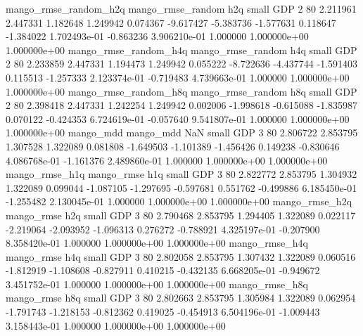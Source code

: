mango_rmse_random_h2q mango_rmse_random                  h2q      small      GDP                 2 80 2.211961       2.447331 1.182648       1.249942    0.074367     -9.617427     -5.383736    -1.577631       0.118647 -1.384022 1.702493e-01    -0.863236   3.906210e-01            1.000000    1.000000e+00        1.000000e+00
mango_rmse_random_h4q mango_rmse_random                  h4q      small      GDP                 2 80 2.233859       2.447331 1.194473       1.249942    0.055222     -8.722636     -4.437744    -1.591403       0.115513 -1.257333 2.123374e-01    -0.719483   4.739663e-01            1.000000    1.000000e+00        1.000000e+00
mango_rmse_random_h8q mango_rmse_random                  h8q      small      GDP                 2 80 2.398418       2.447331 1.242254       1.249942    0.002006     -1.998618     -0.615088    -1.835987       0.070122 -0.424353 6.724619e-01    -0.057640   9.541807e-01            1.000000    1.000000e+00        1.000000e+00
            mango_mdd         mango_mdd                  NaN      small      GDP                 3 80 2.806722       2.853795 1.307528       1.322089    0.081808     -1.649503     -1.101389    -1.456426       0.149238 -0.830646 4.086768e-01    -1.161376   2.489860e-01            1.000000    1.000000e+00        1.000000e+00
       mango_rmse_h1q        mango_rmse                  h1q      small      GDP                 3 80 2.822772       2.853795 1.304932       1.322089    0.099044     -1.087105     -1.297695    -0.597681       0.551762 -0.499886 6.185450e-01    -1.255482   2.130045e-01            1.000000    1.000000e+00        1.000000e+00
       mango_rmse_h2q        mango_rmse                  h2q      small      GDP                 3 80 2.790468       2.853795 1.294405       1.322089    0.022117     -2.219064     -2.093952    -1.096313       0.276272 -0.788921 4.325197e-01    -0.207900   8.358420e-01            1.000000    1.000000e+00        1.000000e+00
       mango_rmse_h4q        mango_rmse                  h4q      small      GDP                 3 80 2.802058       2.853795 1.307432       1.322089    0.060516     -1.812919     -1.108608    -0.827911       0.410215 -0.432135 6.668205e-01    -0.949672   3.451752e-01            1.000000    1.000000e+00        1.000000e+00
       mango_rmse_h8q        mango_rmse                  h8q      small      GDP                 3 80 2.802663       2.853795 1.305984       1.322089    0.062954     -1.791743     -1.218153    -0.812362       0.419025 -0.454913 6.504196e-01    -1.009443   3.158443e-01            1.000000    1.000000e+00        1.000000e+00
